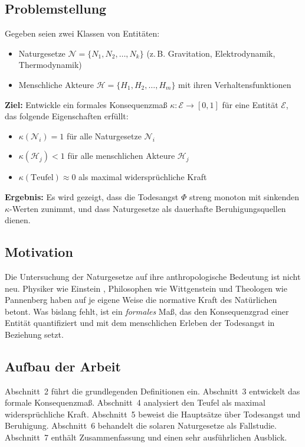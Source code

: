 ﻿\documentclass[a4paper,12pt]{article}
\theoremstyle{definition}
\begin{document}
\subsection{Problemstellung}

Gegeben seien zwei Klassen von Entitäten:

\begin{itemize}
\item Naturgesetze $\mathcal{N} = \{N_1, N_2, \ldots, N_k\}$ (z.\,B. Gravitation, Elektrodynamik, Thermodynamik)
\item Menschliche Akteure $\mathcal{H} = \{H_1, H_2, \ldots, H_m\}$ mit ihren Verhaltensfunktionen
\end{itemize}

\textbf{Ziel:} Entwickle ein formales Konsequenzmaß $\kappa: \mathcal{E} \to [0,1]$ für eine Entität $\mathcal{E}$, das folgende Eigenschaften erfüllt:
\begin{itemize}
\item $\kappa(\mathcal{N}_i) = 1$ für alle Naturgesetze $\mathcal{N}_i$
\item $\kappa(\mathcal{H}_j) < 1$ für alle menschlichen Akteure $\mathcal{H}_j$
\item $\kappa(\text{Teufel}) \approx 0$ als maximal widersprüchliche Kraft
\end{itemize}

\textbf{Ergebnis:} Es wird gezeigt, dass die Todesangst $\Phi$ streng monoton mit sinkenden $\kappa$-Werten zunimmt, und dass Naturgesetze als dauerhafte Beruhigungsquellen dienen.

\subsection{Motivation}

Die Untersuchung der Naturgesetze auf ihre anthropologische Bedeutung ist nicht neu. Physiker wie Einstein \cite{einstein1916}, Philosophen wie Wittgenstein \cite{wittgenstein1921} und Theologen wie Pannenberg \cite{pannenberg1993} haben auf je eigene Weise die normative Kraft des Natürlichen betont. Was bislang fehlt, ist ein \emph{formales} Maß, das den Konsequenzgrad einer Entität quantifiziert und mit dem menschlichen Erleben der Todesangst in Beziehung setzt.

\subsection{Aufbau der Arbeit}

Abschnitt~2 führt die grundlegenden Definitionen ein. Abschnitt~3 entwickelt das formale Konsequenzmaß. Abschnitt~4 analysiert den Teufel als maximal widersprüchliche Kraft. Abschnitt~5 beweist die Hauptsätze über Todesangst und Beruhigung. Abschnitt~6 behandelt die solaren Naturgesetze als Fallstudie. Abschnitt~7 enthält Zusammenfassung und einen sehr ausführlichen Ausblick.
\end{document}
